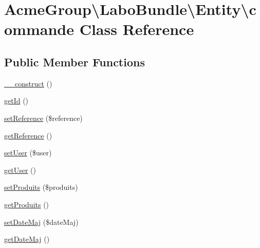 \hypertarget{class_acme_group_1_1_labo_bundle_1_1_entity_1_1commande}{\section{Acme\+Group\textbackslash{}Labo\+Bundle\textbackslash{}Entity\textbackslash{}commande Class Reference}
\label{class_acme_group_1_1_labo_bundle_1_1_entity_1_1commande}
}
\subsection*{Public Member Functions}
\begin{DoxyCompactItemize}
\item 
\hyperlink{class_acme_group_1_1_labo_bundle_1_1_entity_1_1commande_ae59145fe097799da387b4ba96cf6175c}{\+\_\+\+\_\+construct} ()
\item 
\hyperlink{class_acme_group_1_1_labo_bundle_1_1_entity_1_1commande_a2c02bdb8be7f1c91518e3249a1f9d36f}{get\+Id} ()
\item 
\hyperlink{class_acme_group_1_1_labo_bundle_1_1_entity_1_1commande_ab05ae57102f5cee4bcc76f7e81eb8491}{set\+Reference} (\$reference)
\item 
\hyperlink{class_acme_group_1_1_labo_bundle_1_1_entity_1_1commande_a32b757e5d79cfb0ac1f0a1e6f101069e}{get\+Reference} ()
\item 
\hyperlink{class_acme_group_1_1_labo_bundle_1_1_entity_1_1commande_a8b3e44ce80fe94ec9d52ab96a6704869}{set\+User} (\$user)
\item 
\hyperlink{class_acme_group_1_1_labo_bundle_1_1_entity_1_1commande_a54ae6e545d45195452f4ae51455b8c9b}{get\+User} ()
\item 
\hyperlink{class_acme_group_1_1_labo_bundle_1_1_entity_1_1commande_a0e982a15b51034a6b931e6951461d794}{set\+Produits} (\$produits)
\item 
\hyperlink{class_acme_group_1_1_labo_bundle_1_1_entity_1_1commande_a18642c0db1dc6fb4d40afdb68dc25a15}{get\+Produits} ()
\item 
\hyperlink{class_acme_group_1_1_labo_bundle_1_1_entity_1_1commande_ad8b161414b9333fcb0afef32e4d55bb0}{set\+Date\+Maj} (\$date\+Maj)
\item 
\hyperlink{class_acme_group_1_1_labo_bundle_1_1_entity_1_1commande_a9da59dd5175543031ea6adea261ed726}{get\+Date\+Maj} ()
\item 

\end{DoxyCompactItemize}
